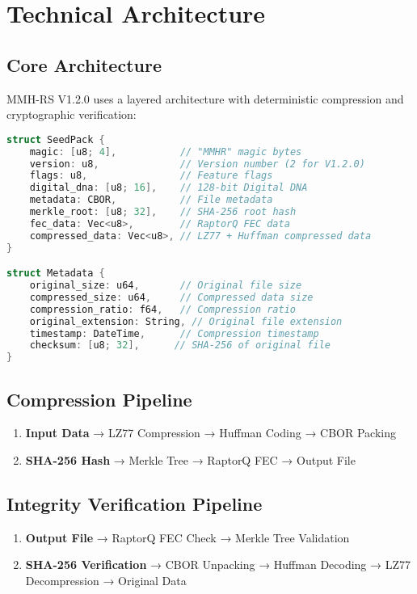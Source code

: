 \documentclass[12pt,a4paper]{article}
\begin{document}
\newpage

\section{Technical Architecture}

\subsection{Core Architecture}
MMH-RS V1.2.0 uses a layered architecture with deterministic compression and cryptographic verification:

\begin{lstlisting}[language=C, caption=Core File Format Structure]
struct SeedPack {
    magic: [u8; 4],           // "MMHR" magic bytes
    version: u8,              // Version number (2 for V1.2.0)
    flags: u8,                // Feature flags
    digital_dna: [u8; 16],    // 128-bit Digital DNA
    metadata: CBOR,           // File metadata
    merkle_root: [u8; 32],    // SHA-256 root hash
    fec_data: Vec<u8>,        // RaptorQ FEC data
    compressed_data: Vec<u8>, // LZ77 + Huffman compressed data
}

struct Metadata {
    original_size: u64,       // Original file size
    compressed_size: u64,     // Compressed data size
    compression_ratio: f64,   // Compression ratio
    original_extension: String, // Original file extension
    timestamp: DateTime,      // Compression timestamp
    checksum: [u8; 32],      // SHA-256 of original file
}
\end{lstlisting}

\subsection{Compression Pipeline}
\begin{enumerate}
    \item \textbf{Input Data} → LZ77 Compression → Huffman Coding → CBOR Packing
    \item \textbf{SHA-256 Hash} → Merkle Tree → RaptorQ FEC → Output File
\end{enumerate}

\subsection{Integrity Verification Pipeline}
\begin{enumerate}
    \item \textbf{Output File} → RaptorQ FEC Check → Merkle Tree Validation
    \item \textbf{SHA-256 Verification} → CBOR Unpacking → Huffman Decoding → LZ77 Decompression → Original Data
\end{enumerate}
\end{document}
